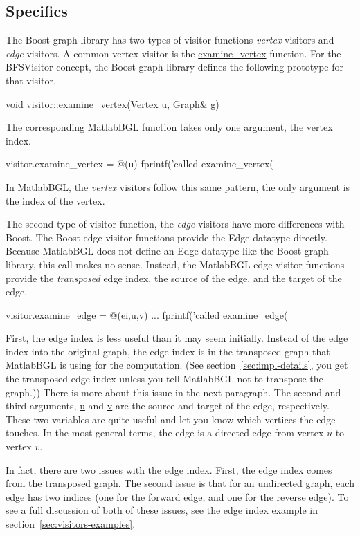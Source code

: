 \documentclass[12pt]{article}
\newcommand{\mycmd}[1]{\url{#1}}
\begin{document}
\subsection{Specifics}
The Boost graph library has two types of visitor functions \emph{vertex} visitors and \emph{edge} visitors.  A common vertex visitor is the \mycmd{examine_vertex} function.  For the BFSVisitor concept, the Boost graph library defines the following prototype for that visitor.
\begin{mcode}
void visitor::examine_vertex(Vertex u, Graph& g)
\end{mcode}
The corresponding MatlabBGL function takes only one argument, the vertex index.
\begin{mcode}
visitor.examine_vertex = @(u) fprintf('called examine_vertex(%
\end{mcode}
In MatlabBGL, the \emph{vertex} visitors follow this same pattern, the only argument is the index of the vertex.

The second type of visitor function, the \emph{edge} visitors have more differences with Boost.  The Boost edge visitor functions provide the Edge datatype directly.  Because MatlabBGL does not define an Edge datatype like the Boost graph library, this call makes no sense.  Instead, the MatlabBGL edge visitor functions provide the \emph{transposed} edge index, the source of the edge, and the target of the edge.  
\begin{mcode}
visitor.examine_edge = @(ei,u,v) ...
    fprintf('called examine_edge(%
\end{mcode}
First, the edge index is less useful than it may seem initially.  Instead of the edge index into the original graph, the edge index is in the transposed graph that MatlabBGL is using for the computation.  (See section~\ref{sec:impl-details}, you get the transposed edge index unless you tell MatlabBGL not to transpose the graph.))  There is more about this issue in the next paragraph.  The second and third arguments, \mycmd{u} and \mycmd{v} are the source and target of the edge, respectively.  These two variables are quite useful and let you know which vertices the edge touches.  In the most general terms, the edge is a directed edge from vertex $u$ to vertex $v$.  

In fact, there are two issues with the edge index.  First, the edge index comes from the transposed graph.  The second issue is that for an undirected graph, each edge has two indices (one for the forward edge, and one for the reverse edge).  To see a full discussion of both of these issues, see the edge index example in section~\ref{sec:visitors-examples}.
\end{document}

